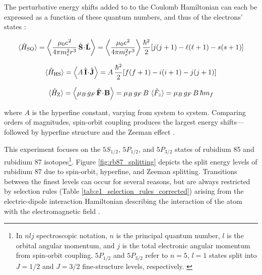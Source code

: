 \documentclass[11pt]{article}
\begin{document}
The perturbative energy shifts added to to the Coulomb Hamiltonian
can each be expressed as a function
of these quantum numbers, and thus of the electrons' states
\cite{qmech, harris}:

\begin{equation}
  \braket{\hat H_\text{SO}}
  = \left\langle
  \frac{\mu_0 e^2}{4\pi m_e^2 r^3}\,
  \hat{\mathbf S}\!\cdot\!\hat{\mathbf L}
  \right\rangle
  = \left\langle
  \frac{\mu_0 e^2}{4\pi m_e^2 r^3}
  \right\rangle
  \frac{\hbar^2}{2}\!\left[
    j(j+1)-\ell(\ell+1)-s(s+1)
  \right]
  \label{eq:spinorbit}
\end{equation}

\begin{equation}
  \braket{\hat H_\text{HS}}
  = \left\langle
  A\,\hat{\mathbf I}\!\cdot\!\hat{\mathbf J}
  \right\rangle
  = A\,\frac{\hbar^2}{2}\!\left[
    f(f+1)-i(i+1)-j(j+1)
  \right]
  \label{eq:hyperfine}
\end{equation}

\begin{equation}
  \braket{\hat H_\text{Z}}
  = \left\langle
  \mu_B\, g_F \,\hat{\mathbf F}\!\cdot\!\mathbf B
  \right\rangle
  = \mu_B\, g_F \, B\,\braket{\hat F_z}
  = \mu_B\, g_F \, B\, \hbar m_f
  \label{eq:zeeman}
\end{equation}

where $A$ is the hyperfine constant, varying from system to system.
Comparing orders of magnitudes, spin-orbit coupling produces the
largest energy shifts---followed by hyperfine structure and the
Zeeman effect \cite{harris}.


This experiment focuses on the $5S_{1/2}$, $5P_{1/2}$, and $5P_{3/2}$ states of
rubidium 85 and rubidium 87 isotopes\footnote{In $nlj$ spectroscopic
  notation, $n$ is the principal quantum number, $l$ is the orbital
  angular momentum, and $j$ is the total electronic angular momentum
  from spin-orbit coupling. $5P_{1/2}$ and $5P_{3/2}$ refer to $n=5$,
  $l=1$ states split into $J=1/2$ and $J=3/2$ fine-structure levels,
respectively. \cite{harris}}. Figure \ref{fig:rb87_splitting} depicts
the split energy
levels of rubidium 87 due to spin-orbit, hyperfine, and Zeeman
splitting. Transitions between the finest levels can occur for
several reasons, but are always restricted by
selection rules (Table
\ref{tab:e1_selection_rules_corrected})  arising
from the electric-dipole interaction Hamiltonian describing the
interaction of the atom with the electromagnetic field \cite{qmech,
harris,griffiths_qm}.
\end{document}
